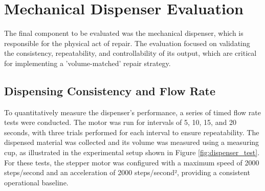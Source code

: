 \section{Mechanical Dispenser Evaluation}
\label{sec:dispenser_evaluation}
The final component to be evaluated was the mechanical dispenser, which is responsible for the physical act of repair. The evaluation focused on validating the consistency, repeatability, and controllability of its output, which are critical for implementing a 'volume-matched' repair strategy.

\subsection{Dispensing Consistency and Flow Rate}
To quantitatively measure the dispenser's performance, a series of timed flow rate tests were conducted. The motor was run for intervals of 5, 10, 15, and 20 seconds, with three trials performed for each interval to ensure repeatability. The dispensed material was collected and its volume was measured using a measuring cup, as illustrated in the experimental setup shown in Figure \ref{fig:dispenser_test}. For these tests, the stepper motor was configured with a maximum speed of 2000 steps/second and an acceleration of 2000 steps/second², providing a consistent operational baseline.

